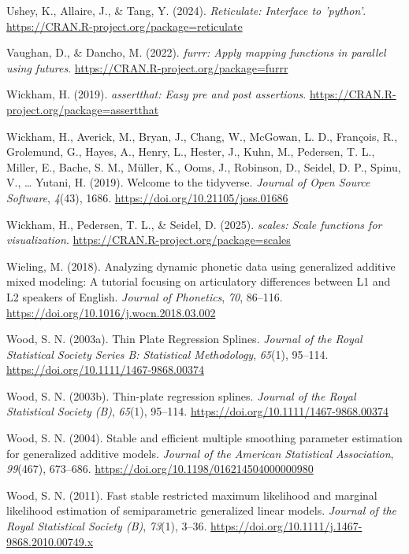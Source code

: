 \documentclass[
  doc,
  floatsintext,
  longtable,
  a4paper,
  nolmodern,
  notxfonts,
  notimes,
  donotrepeattitle,
  colorlinks=true,linkcolor=blue,citecolor=blue,urlcolor=blue]{apa7}
\newlength{\cslhangindent}
\newenvironment{CSLReferences}[2] %
 {\begin{list}{}{%
  \setlength{\itemindent}{0pt}
  \setlength{\leftmargin}{0pt}
  \setlength{\parsep}{0pt}
  \ifodd #1
   \setlength{\leftmargin}{\cslhangindent}
   \setlength{\itemindent}{-1\cslhangindent}
  \fi
  \setlength{\itemsep}{#2\baselineskip}}}
 {\end{list}}
\begin{document}
\begin{CSLReferences}{1}{0}
Ushey, K., Allaire, J., \& Tang, Y. (2024). \emph{Reticulate: Interface
to 'python'}. \url{https://CRAN.R-project.org/package=reticulate}

Vaughan, D., \& Dancho, M. (2022). \emph{{furrr}: Apply mapping
functions in parallel using futures}.
\url{https://CRAN.R-project.org/package=furrr}

Wickham, H. (2019). \emph{{assertthat}: Easy pre and post assertions}.
\url{https://CRAN.R-project.org/package=assertthat}

Wickham, H., Averick, M., Bryan, J., Chang, W., McGowan, L. D.,
François, R., Grolemund, G., Hayes, A., Henry, L., Hester, J., Kuhn, M.,
Pedersen, T. L., Miller, E., Bache, S. M., Müller, K., Ooms, J.,
Robinson, D., Seidel, D. P., Spinu, V., \ldots{} Yutani, H. (2019).
Welcome to the {tidyverse}. \emph{Journal of Open Source Software},
\emph{4}(43), 1686. \url{https://doi.org/10.21105/joss.01686}

Wickham, H., Pedersen, T. L., \& Seidel, D. (2025). \emph{{scales}:
Scale functions for visualization}.
\url{https://CRAN.R-project.org/package=scales}

Wieling, M. (2018). Analyzing dynamic phonetic data using generalized
additive mixed modeling: A tutorial focusing on articulatory differences
between L1 and L2 speakers of English. \emph{Journal of Phonetics},
\emph{70}, 86--116. \url{https://doi.org/10.1016/j.wocn.2018.03.002}

Wood, S. N. (2003a). Thin Plate Regression Splines. \emph{Journal of the
Royal Statistical Society Series B: Statistical Methodology},
\emph{65}(1), 95--114. \url{https://doi.org/10.1111/1467-9868.00374}

Wood, S. N. (2003b). Thin-plate regression splines. \emph{Journal of the
Royal Statistical Society (B)}, \emph{65}(1), 95--114.
\url{https://doi.org/10.1111/1467-9868.00374}

Wood, S. N. (2004). Stable and efficient multiple smoothing parameter
estimation for generalized additive models. \emph{Journal of the
American Statistical Association}, \emph{99}(467), 673--686.
\url{https://doi.org/10.1198/016214504000000980}

Wood, S. N. (2011). Fast stable restricted maximum likelihood and
marginal likelihood estimation of semiparametric generalized linear
models. \emph{Journal of the Royal Statistical Society (B)},
\emph{73}(1), 3--36.
\url{https://doi.org/10.1111/j.1467-9868.2010.00749.x}


\end{CSLReferences}
\end{document}

